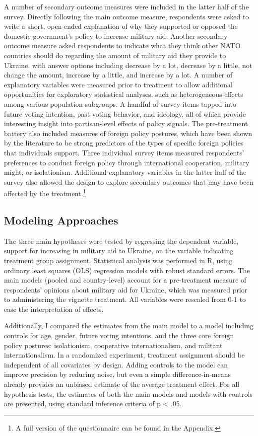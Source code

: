 A number of secondary outcome measures were included in the latter half of the survey. Directly following the main outcome measure, respondents were asked to write a short, open-ended explanation of why they supported or opposed the domestic government's policy to increase military aid. Another secondary outcome measure asked respondents to indicate what they think other NATO countries should do regarding the amount of military aid they provide to Ukraine, with answer options including decrease by a lot, decrease by a little, not change the amount, increase by a little, and increase by a lot. A number of explanatory variables were measured prior to treatment to allow additional opportunities for exploratory statistical analyses, such as heterogeneous effects among various population subgroups. A handful of survey items tapped into future voting intention, past voting behavior, and ideology, all of which provide interesting insight into partisan-level effects of policy signals. The pre-treatment battery also included measures of foreign policy postures, which have been shown by the literature to be strong predictors of the types of specific foreign policies that individuals support. \autocite{wittkopf_foreign_1986, rathbun_taking_2016, gravelle_structure_2017, rathbun_towards_2020} Three individual survey items measured respondents' preferences to conduct foreign policy through international cooperation, military might, or isolationism. Additional explanatory variables in the latter half of the survey also allowed the design to explore secondary outcomes that may have been affected by the treatment.\footnote{A full version of the questionnaire can be found in the Appendix.}

\subsection{Modeling Approaches}
The three main hypotheses were tested by regressing the dependent variable, support for increasing in military aid to Ukraine, on the variable indicating treatment group assignment. Statistical analysis was performed in R, using ordinary least squares (OLS) regression models with robust standard errors. The main models (pooled and country-level) account for a pre-treatment measure of respondents’ opinions about military aid for Ukraine, which was measured prior to administering the vignette treatment. All variables were rescaled from 0-1 to ease the interpretation of effects.  

Additionally, I compared the estimates from the main model to a model including controls for age, gender, future voting intentions, and the three core foreign policy postures: isolationism, cooperative internationalism, and militant internationalism.\autocite{rathbun_towards_2020} In a randomized experiment, treatment assignment should be independent of all covariates by design. Adding controls to the model can improve precision by reducing noise, but even a simple difference-in-means already provides an unbiased estimate of the average treatment effect.\autocite{mutz_population-based_2011} For all hypothesis tests, the estimates of both the main models and models with controls are presented, using standard inference criteria of p < .05.

